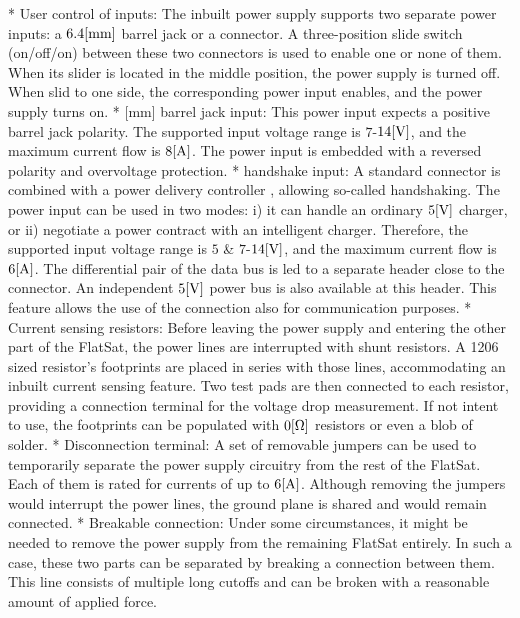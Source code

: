 \begitems
    * {\sbf User control of inputs:} The inbuilt power supply supports two separate power inputs: a $6.4\rm{[mm]}$ barrel jack or a  connector. A three-position slide switch (on/off/on) between these two connectors is used to enable one or none of them. When its slider is located in the middle position, the power supply is turned off. When slid to one side, the corresponding power input enables, and the power supply turns on.
    * {[mm] barrel jack input:} This power input expects a positive barrel jack polarity. The supported input voltage range is $7$-$14\rm{[V]}$, and the maximum current flow is $8\rm{[A]}$. The power input is embedded with a reversed polarity and overvoltage protection.
    * {\sbf {} handshake input:} A standard  connector is combined with a power delivery controller , allowing so-called handshaking. The power input can be used in two modes: i) it can handle an ordinary $5\rm{[V]}$  charger, or ii) negotiate a power contract with an intelligent  charger. Therefore, the supported input voltage range is $5$ \& $7$-$14\rm{[V]}$, and the maximum current flow is $6\rm{[A]}$.  The differential pair of the  data bus is led to a separate header close to the connector. An independent $5\rm{[V]}$ power bus is also available at this header. This feature allows the use of the  connection also for communication purposes.
    * {\sbf Current sensing resistors:} Before leaving the power supply and entering the other part of the FlatSat, the power lines are interrupted with shunt resistors. A 1206 sized  resistor's footprints are placed in series with those lines, accommodating an inbuilt current sensing feature. Two test pads are then connected to each resistor, providing a connection terminal for the voltage drop measurement. If not intent to use, the footprints can be populated with $0\rm{[\Omega]}$ resistors or even a blob of solder.
    * {\sbf Disconnection terminal:} A set of removable jumpers can be used to temporarily separate the power supply circuitry from the rest of the FlatSat. Each of them is rated for currents of up to $6\rm{[A]}$. Although removing the jumpers would interrupt the power lines, the ground plane is shared and  would remain connected.
    * {\sbf Breakable connection:} Under some circumstances, it might be needed to remove the power supply from the remaining FlatSat entirely. In such a case, these two parts can be separated by breaking a connection between them. This line consists of multiple long cutoffs and can be broken with a reasonable amount of applied force.
